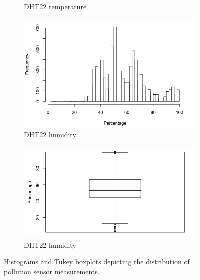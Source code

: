 \documentclass[11pt,twosided,a4paper]{report}
\begin{document}
\begin{figure}[!tbp]
\begin{minipage}{1\linewidth}
\begin{subfigure}[t]{.4\linewidth}
            	\caption{DHT22 temperature}
            	\label{fig:temp_boxplot}
	   \end{subfigure}
        \end{minipage}
    \begin{minipage}{1\linewidth}
            \begin{subfigure}[t]{.4\linewidth}
                \includegraphics[width=\textwidth]{images/humidity_histogram}
                \caption{DHT22 humidity}
                \label{fig:humidity_histogram}
            \end{subfigure}
            \hfill
            \begin{subfigure}[t]{.4\linewidth}
            	\includegraphics[width=\textwidth]{images/humidity_boxplot}
            	\caption{DHT22 humidity}
            	\label{fig:humidity_boxplot}
	   \end{subfigure}
        \end{minipage}
    \caption[Sensor measurement histograms and boxplots.]{Histograms and Tukey boxplots depicting the distribution of pollution sensor measurements.}
    \label{fig:histograms_and_boxplots}
\end{figure}
\end{document}
